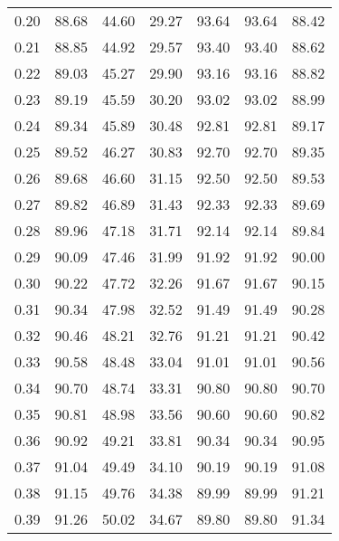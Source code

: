 \begin{tabular}{|c|c|c|c|c|c|c|}
      0.20 &     88.68 &     44.60 &      29.27 &   93.64 &      93.64 &         88.42 \\
      0.21 &     88.85 &     44.92 &      29.57 &   93.40 &      93.40 &         88.62 \\
      0.22 &     89.03 &     45.27 &      29.90 &   93.16 &      93.16 &         88.82 \\
      0.23 &     89.19 &     45.59 &      30.20 &   93.02 &      93.02 &         88.99 \\
      0.24 &     89.34 &     45.89 &      30.48 &   92.81 &      92.81 &         89.17 \\
      0.25 &     89.52 &     46.27 &      30.83 &   92.70 &      92.70 &         89.35 \\
      0.26 &     89.68 &     46.60 &      31.15 &   92.50 &      92.50 &         89.53 \\
      0.27 &     89.82 &     46.89 &      31.43 &   92.33 &      92.33 &         89.69 \\
      0.28 &     89.96 &     47.18 &      31.71 &   92.14 &      92.14 &         89.84 \\
      0.29 &     90.09 &     47.46 &      31.99 &   91.92 &      91.92 &         90.00 \\
      0.30 &     90.22 &     47.72 &      32.26 &   91.67 &      91.67 &         90.15 \\
      0.31 &     90.34 &     47.98 &      32.52 &   91.49 &      91.49 &         90.28 \\
      0.32 &     90.46 &     48.21 &      32.76 &   91.21 &      91.21 &         90.42 \\
      0.33 &     90.58 &     48.48 &      33.04 &   91.01 &      91.01 &         90.56 \\
      0.34 &     90.70 &     48.74 &      33.31 &   90.80 &      90.80 &         90.70 \\
      0.35 &     90.81 &     48.98 &      33.56 &   90.60 &      90.60 &         90.82 \\
      0.36 &     90.92 &     49.21 &      33.81 &   90.34 &      90.34 &         90.95 \\
      0.37 &     91.04 &     49.49 &      34.10 &   90.19 &      90.19 &         91.08 \\
      0.38 &     91.15 &     49.76 &      34.38 &   89.99 &      89.99 &         91.21 \\
      0.39 &     91.26 &     50.02 &      34.67 &   89.80 &      89.80 &         91.34 \\

\end{tabular}
